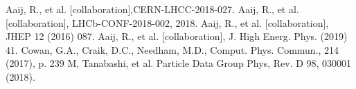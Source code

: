 \documentclass{appolb}
\begin{document}
\begin{thebibliography}{3}
Aaij, R., et al. [\lhcb collaboration],CERN-LHCC-2018-027.
Aaij, R., et al. [\lhcb collaboration],  LHCb-CONF-2018-002, 2018.
Aaij, R., et al. [\lhcb collaboration], JHEP 12 (2016) 087.
Aaij, R., et al. [\lhcb collaboration], J. High Energ. Phys. (2019) 41. 
Cowan, G.A., Craik, D.C., Needham, M.D., Comput. Phys. Commun., 214 (2017), p. 239
M, Tanabashi, et al. Particle Data Group Phys, Rev. D 98, 030001 (2018). 
\end{thebibliography}
\end{document}
